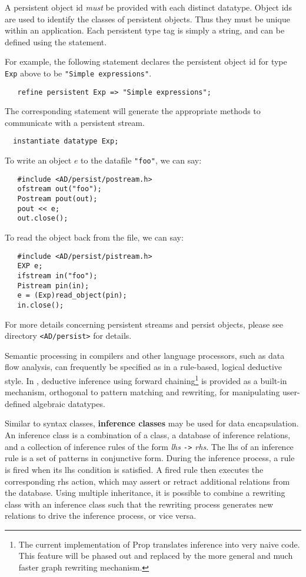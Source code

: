 A {persistent object id} {\em must} be provided with each distinct
datatype.  Object ids are used to identify the classes
of persistent objects.  Thus they must be unique within an application.
Each persistent type tag is simply a string, and can be defined using
the  statement.  

For example, the following statement declares the persistent object
id for type \verb|Exp| above to be \verb|"Simple expressions"|.
\begin{verbatim}
   refine persistent Exp => "Simple expressions";
\end{verbatim}

The corresponding  statement will generate
the appropriate methods to communicate with a persistent stream.
\begin{verbatim}
  instantiate datatype Exp;
\end{verbatim}

To write an object $e$ to the datafile \verb|"foo"|, we can say:
\begin{verbatim}
   #include <AD/persist/postream.h>
   ofstream out("foo");
   Postream pout(out);
   pout << e;
   out.close();
\end{verbatim}

To read the object back from the file, we can say:
\begin{verbatim} 
   #include <AD/persist/pistream.h>
   EXP e;
   ifstream in("foo");
   Pistream pin(in);
   e = (Exp)read_object(pin);
   in.close();
\end{verbatim}

For more details concerning persistent streams and persist objects, 
please see directory \verb|<AD/persist>| for details.

 \label{sec:inference}

   Semantic processing
in compilers and other language processors, such as data flow analysis,
can frequently be specified as in a rule-based,
logical deductive style.  In \Prop, deductive inference using forward
chaining\footnote{
The current
implementation of {\sf Prop} translates inference into very naive code.
This feature will be phased out and replaced by
the more general and much faster graph rewriting mechanism.  
}
is provided as a built-in mechanism, orthogonal
to pattern matching and rewriting, for manipulating user-defined
algebraic datatypes.
 
Similar to syntax classes, {\bf inference classes} may be used
for data encapsulation.  An inference class is a combination of a \Cpp{}
class, a database of inference relations, and a collection of inference rules
of the form {\em lhs \verb|->| rhs}.  The lhs of an inference rule is a set
of patterns in conjunctive form.  During the inference process, a rule is
fired when its lhs condition is satisfied.  A fired rule then executes
the corresponding rhs action, which may assert or retract additional relations
from the database.   Using multiple inheritance, it is possible to combine
a rewriting class with an inference class such that the rewriting process
generates new relations to drive the inference process, or vice versa.

